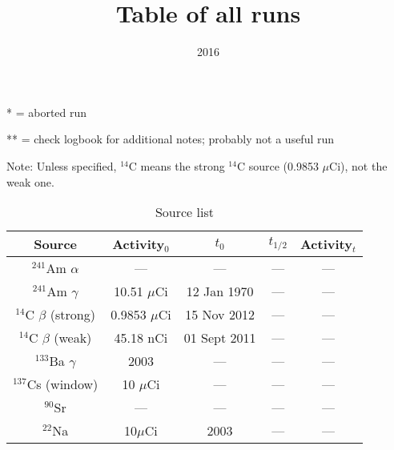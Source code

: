\documentclass[12pt]{amsart}
\title{Table of all runs}
\date{2016}
\begin{document}
\maketitle

* = aborted run

** = check logbook for additional notes; probably not a useful run

Note: Unless specified, $^{14}$C means the strong $^{14}$C source (0.9853 $\mu$Ci), not the weak one. 

\begin{table}[!htbp]
	\centering
	\caption{Source list}
	\label{tab:table0}
	\hspace*{-1cm}
	\begin{tabular}{ccccc}
		\toprule
		Source & Activity$_0$ & $t_0$ & $t_{1/2}$ & Activity$_t$\\
		\midrule
		$^{241}$Am $\alpha$ & --- & --- & --- & ---\\
		$^{241}$Am $\gamma$ & 10.51 $\mu$Ci & 12 Jan 1970 & --- & ---\\
		$^{14}$C $\beta$ (strong) & 0.9853 $\mu$Ci & 15 Nov 2012 & --- & ---\\
		$^{14}$C $\beta$ (weak) & 45.18 nCi & 01 Sept 2011 & --- & ---\\
		$^{133}$Ba $\gamma$ & 2003 & --- & --- & ---\\
		$^{137}$Cs (window) & 10 $\mu$Ci & --- & --- & ---\\
		$^{90}$Sr & --- & --- & --- & ---\\
		$^{22}$Na & 10$\mu$Ci & 2003 & --- & ---\\
		\bottomrule
	\end{tabular}
	\hspace*{-1cm}
\end{table}
\end{document}
